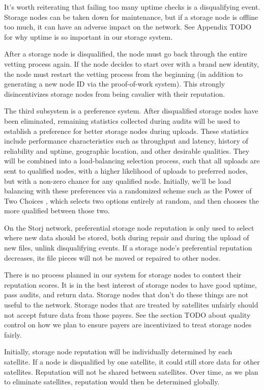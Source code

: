 \documentclass[11pt,fleqn,openany]{book}
\newcommand{\todo}[1]{{\color{red} TODO #1 }}
\begin{document}
It's worth reiterating that failing too many uptime checks is a disqualifying
event. Storage nodes can be taken down for maintenance, but if a storage node
is offline too much, it can have an adverse impact on the network. See Appendix
\todo{} for why uptime is so important in our storage system.

After a storage node is disqualified, the node must go back through the entire
vetting process again. If the node decides to start over with a brand new
identity, the node must restart the vetting process from the beginning (in
addition to generating a new node ID via the proof-of-work system). This
strongly disincentivizes storage nodes from being cavalier with their
reputation.

The third subsystem is a preference system. After disqualified storage nodes
have been eliminated, remaining statistics collected during audits
will be used to establish a preference for better storage nodes during uploads.
These statistics include performance characteristics such as throughput and
latency, history of reliability and uptime, geographic location, and other
desirable qualities.
They will be combined into a load-balancing selection process, such
that all uploads are sent to qualified nodes, with a higher likelihood of
uploads to preferred nodes, but with a non-zero chance for any qualified node.
Initially, we'll be load balancing with these preferences via a randomized
scheme such as the Power of Two Choices \cite{power-of-two-choices}, which
selects two options entirely at random, and then chooses the more qualified
between those two.

On the Storj network, preferential storage node reputation is only used to
select where new data should be stored, both during repair and during the
upload of new files, unlink disqualifying events.
If a storage node's preferential reputation decreases, its file pieces will not
be moved or repaired to other nodes.

There is no process planned in our system for storage nodes to contest their
reputation scores. It is in the best interest of storage nodes to have good
uptime, pass audits, and return data. Storage nodes that don't do these things
are not useful to the network. Storage nodes that are treated by satellites
unfairly should not accept future data from those payers. See the section
\todo{} about quality control on how we plan to ensure payers are incentivized
to treat storage nodes fairly.

Initially, storage node reputation will be individually determined by each
satellite. If a node is disqualified by one satellite, it could still
store data for other satellites. Reputation will not be shared between
satellites. Over time, as we plan to eliminate satellites,
reputation would then be determined globally.
\end{document}

